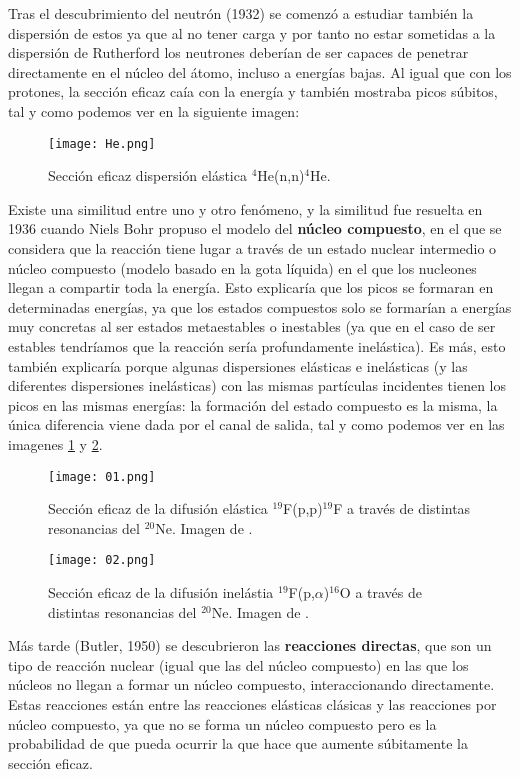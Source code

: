 \documentclass[fleqn,11pt]{SelfArx} %
\begin{document}
Tras el descubrimiento del neutrón (1932) se comenzó a estudiar también la dispersión de estos ya que al no tener carga y por tanto no estar sometidas a la dispersión de Rutherford los neutrones deberían de ser capaces de penetrar directamente en el núcleo del átomo, incluso a energías bajas. Al igual que con los protones, la sección eficaz caía con la energía y también mostraba picos súbitos, tal y como podemos ver en la siguiente imagen:

\begin{figure}[h!] \centering
	\texttt{[image: He.png]}
	\caption{Sección eficaz dispersión elástica $^4$He(n,n)$^4$He.}
\end{figure}
Existe una similitud entre uno y otro fenómeno, y la similitud fue resuelta en 1936 cuando Niels Bohr propuso el modelo del \textbf{núcleo compuesto}, en el que se considera que la reacción tiene lugar a través de un estado nuclear intermedio o núcleo compuesto (modelo basado en la gota líquida) en el que los nucleones llegan a compartir toda la energía. Esto explicaría que los picos se formaran en determinadas energías, ya que los estados compuestos solo se formarían a energías muy concretas al ser estados metaestables o inestables (ya que en el caso de ser estables tendríamos que la reacción sería profundamente inelástica). Es más, esto también explicaría porque algunas dispersiones elásticas e inelásticas (y las diferentes dispersiones inelásticas) con las mismas partículas incidentes tienen los picos en las mismas energías: la formación del estado compuesto es la misma, la única diferencia viene dada por el canal de salida, tal y como podemos ver en las imagenes \ref{Fig:02} y \ref{Fig:03}.

\begin{figure}[h!] \centering
	\texttt{[image: 01.png]}
	\caption{Sección eficaz de la difusión elástica $^{19}$F(p,p)$^{19}$F a través de distintas resonancias del $^{20}$Ne. Imagen de \cite{USC}.}
	\label{Fig:02}
\end{figure}
\begin{figure}[h!] \centering
	\texttt{[image: 02.png]}
	\caption{Sección eficaz de la difusión inelástia $^{19}$F(p,$\alpha$)$^{16}$O a través de distintas resonancias del $^{20}$Ne. Imagen de \cite{USC}.}
	\label{Fig:03}
\end{figure}

Más tarde (Butler, 1950) se descubrieron las \textbf{reacciones directas}, que son un tipo de reacción nuclear (igual que las del núcleo compuesto) en las que los núcleos no llegan a formar un núcleo compuesto, interaccionando directamente. Estas reacciones están entre las reacciones elásticas clásicas y las reacciones por núcleo compuesto, ya que no se forma un núcleo compuesto pero es la probabilidad de que pueda ocurrir la que hace que aumente súbitamente la sección eficaz. 
\end{document}
